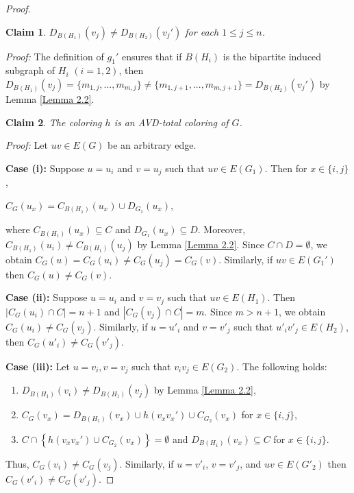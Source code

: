 \documentclass[10pt,a4paper]{amsart}
\newtheorem{claim}{Claim}
\begin{document}
\begin{proof}
\begin{claim}\label{Claim 9}
{\em $D_{B(H_1)}(v_j)\neq D_{B(H_2)}(v_j')$ for each $1\leq j\leq n$.}
\end{claim}

\textit{Proof:}
The definition of $g_1'$ ensures that if $B(H_i)$ is the bipartite induced subgraph of $H_i$ $(i=1,2)$, then $D_{B(H_1)}(v_j)=\{m_{1,j},...,m_{m,j}\}\neq \{m_{1,j+1},...,m_{m,j+1}\}= D_{B(H_2)}(v_j')$ by Lemma \ref{Lemma 2.2}.    

\begin{claim}\label{Claim 10}
{\em The coloring $h$ is an AVD-total coloring of $G$.}
\end{claim}

\textit{Proof:}
Let $uv \in E(G)$ be an arbitrary edge. 

\textbf{Case (i):}
Suppose $u=u_i$ and $v=u_j$ such that $uv\in E(G_1)$.
Then for $x\in \{i,j\}$,
\begin{center}
    $C_G(u_x)=C_{B(H_1)}(u_x)\cup D_{G_1}(u_x)$,
\end{center}
where $C_{B(H_1)}(u_x)\subseteq C$ and $D_{G_1}(u_x)\subseteq D$. Moreover, $C_{B(H_1)}(u_i)\neq C_{B(H_1)}(u_j)$ by Lemma \ref{Lemma 2.2}.
Since $C\cap D=\emptyset$, we obtain $C_{G}(u)=C_G(u_i)\neq C_G(u_j)=C_{G}(v)$.
Similarly, if $uv\in E(G_1')$ then $C_G(u)\neq C_G(v)$.

\textbf{Case (ii):} 
Suppose $u=u_i$ and $v=v_j$ such that $uv\in E(H_1)$. 
Then $|C_G(u_i)\cap C|=n+1$ and
$|C_G(v_j)\cap C|=m$.
Since $m>n+1$, we obtain
$C_G(u_i)\neq C_G(v_j)$.
Similarly, if $u=u'_i$ and $v=v'_j$ such that $u'_iv'_j\in E(H_2)$, then $C_G(u'_i)\neq C_{G}(v'_j)$.     

\textbf{Case (iii):} 
Let $u=v_i, v=v_j$ such that $v_iv_j\in E(G_2)$. The following holds:
\begin{enumerate}
    \item $D_{B(H_1)}(v_i)\neq D_{B(H_1)}(v_j)$ by Lemma \ref{Lemma 2.2},
    
    \item $C_{G}(v_x)=D_{B(H_1)}(v_x)\cup h(v_xv_x')\cup C_{G_2}(v_x)$ for $x\in \{i,j\}$, 
    
    \item $C 
    \cap
    \left\{
    h(v_xv_x')\cup C_{G_2}(v_x)
    \right\}
    =\emptyset$ and $D_{B(H_1)}(v_x)\subseteq C$ for $x\in \{i,j\}$.
\end{enumerate}
Thus, $C_{G}(v_i)\neq C_{G}(v_j)$.
Similarly, if $u=v'_i$, $v=v'_j$, and $uv\in E(G'_2)$ then $C_{G}(v'_i)\neq C_{G}(v'_j)$.


\end{proof}
\end{document}
